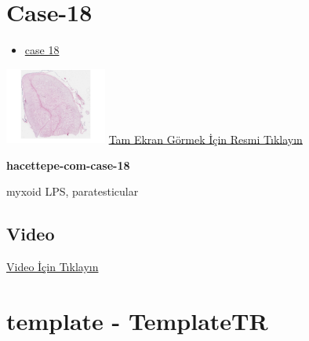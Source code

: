 \documentclass[
  letterpaper,
  DIV=11,
  numbers=noendperiod]{scrreprt}
\providecommand{\tightlist}{%
  \setlength{\itemsep}{0pt}\setlength{\parskip}{0pt}}\usepackage{longtable,booktabs,array}
\begin{document}
\hypertarget{sec-hacettepe-case-of-the-month-case-18}{%
\section{Case-18}\label{sec-hacettepe-case-of-the-month-case-18}}

\begin{itemize}
\tightlist
\item
  \href{https://www.youtube.com/watch?v=5c_5A4z6tro&ab_channel=KemalKosemehmetoglu}{case
  18}
\end{itemize}

\href{https://images.patolojiatlasi.com/hacettepe-com-case-1/HE.html}{\includegraphics[width=0.25\textwidth,height=\textheight]{./screenshots/thumbnail_hacettepe-com-case-18.png}}
\href{https://images.patolojiatlasi.com/hacettepe-com-case-18/HE.html}{Tam
Ekran Görmek İçin Resmi Tıklayın}

\textbf{hacettepe-com-case-18}

\begin{tcolorbox}[enhanced jigsaw, breakable, opacitybacktitle=0.6, arc=.35mm, colbacktitle=quarto-callout-tip-color!10!white, colback=white, toptitle=1mm, left=2mm, opacityback=0, colframe=quarto-callout-tip-color-frame, titlerule=0mm, rightrule=.15mm, bottomrule=.15mm, toprule=.15mm, bottomtitle=1mm, title=\textcolor{quarto-callout-tip-color}{\faLightbulb}\hspace{0.5em}{Tanı}, coltitle=black, leftrule=.75mm]

myxoid LPS, paratesticular

\end{tcolorbox}

\hypertarget{video-17}{%
\subsection{Video}\label{video-17}}

\href{https://www.youtube.com/watch?v=5c_5A4z6tro}{Video İçin Tıklayın}

\hypertarget{sec-template}{%
\section{template - TemplateTR}\label{sec-template}}
\end{document}

